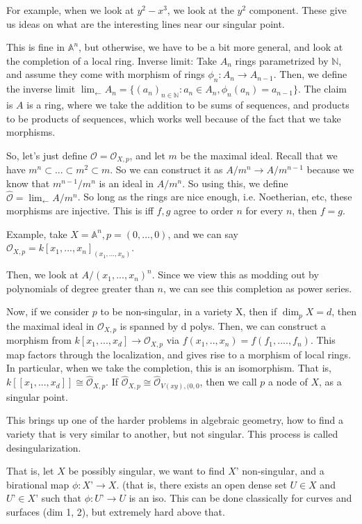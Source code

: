 \documentclass[10pt]{article}
\begin{document}
For example, when we look at $y^2 - x^3$, we look at the $y^2$ component. These give us ideas on what are the interesting lines near our singular point. 

This is fine in $\mathbb{A}^n$, but otherwise, we have to be a bit more general, and look at the completion of a local ring. Inverse limit: Take $A_n$ rings parametrized by $\mathbb{N}$, and assume they come with morphism of rings $\phi_n: A_n \to A_{n-1}$. Then, we define the inverse limit $\lim_{\leftarrow} A_n = \{ (a_n )_{n \in \mathbb{N}} : a_n \in A_n, \phi_n (a_n)  = a_{n-1} \}$. The claim is $A$ is a ring, where we take the addition to be sums of sequences, and products to be products of sequences, which works well because of the fact that we take morphisms.

So, let’s just define $\mathcal{O} = \mathcal{O}_{X,p}$, and let $m$ be the maximal ideal. Recall that we have $m^n \subset ... \subset m^2 \subset m$. So we can construct it as $A / m^n \to A / m^{n-1}$ because we know that $m^{n-1} / m^n$ is an ideal in $A / m^n$. So using this, we define $\hat{\mathcal{O}} = \lim_{\leftarrow} A / m^n$. So long as the rings are nice enough, i.e. Noetherian, etc, these morphisms are injective. This is iff $f,g$ agree to order $n$ for every $n$, then $f = g$.

Example, take $X = \mathbb{A}^n, p = (0,...,0)$, and we can say $\mathcal{O}_{X,p} = k[x_1,...,x_n]_{(x_1,...,x_n)}$.

Then, we look at $A / (x_1,...,x_n)^n$. Since we view this as modding out by polynomials of degree greater than $n$, we can see this completion as power series.

Now, if we consider $p$ to be non-singular, in a variety X, then if $\dim_p X = d$, then the maximal ideal in $\mathcal{O}_{X,p}$ is spanned by d polys.
Then, we can construct a morphism from $k[x_1,...,x_d] \to \mathcal{O}_{X,p}$ via $f(x_1,..,x_n) = f(f_1,....,f_n)$. This map factors through the localization, and gives rise to a morphism of local rings. In particular, when we take the completion, this is an isomorphism. That is, $k[[x_1,...,x_d]] \cong \hat{\mathcal{O}}_{X,p}$. If $\hat{\mathcal{O}}_{X,p} \cong \hat{\mathcal{O}}_{V(xy),(0,0}$, then we call $p$ a node of $X$, as a singular point. 

This brings up one of the harder problems in algebraic geometry, how to find a variety that is very similar to another, but not singular. This process is called desingularization.

That is, let $X$ be possibly singular, we want to find $X’$ non-singular, and a birational map $\phi: X’ \to X$. (that is, there exists an open dense set $U \in X$ and $U’  \in X’$ such that $\phi: U’ \to U$ is an iso. This can be done classically for curves and surfaces (dim 1, 2), but extremely hard above that.
\end{document}
